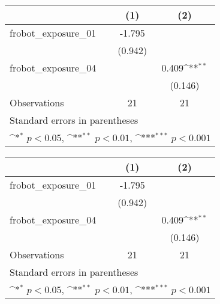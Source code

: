 {
\def\sym#1{\ifmmode^{#1}\else\(^{#1}\)\fi}
\begin{tabular}{l*{2}{c}}
\toprule
                    &\multicolumn{1}{c}{(1)}         &\multicolumn{1}{c}{(2)}         \\
\midrule
frobot\_exposure\_01  &      -1.795         &                     \\
                    &     (0.942)         &                     \\
\addlinespace
frobot\_exposure\_04  &                     &       0.409\sym{**} \\
                    &                     &     (0.146)         \\
\midrule
Observations        &          21         &          21         \\
\bottomrule
\multicolumn{3}{l}{\footnotesize Standard errors in parentheses}\\
\multicolumn{3}{l}{\footnotesize \sym{*} \(p<0.05\), \sym{**} \(p<0.01\), \sym{***} \(p<0.001\)}\\
\end{tabular}
}
{
\def\sym#1{\ifmmode^{#1}\else\(^{#1}\)\fi}
\begin{tabular}{l*{2}{c}}
\toprule
                    &\multicolumn{1}{c}{(1)}         &\multicolumn{1}{c}{(2)}         \\
\midrule
frobot\_exposure\_01  &      -1.795         &                     \\
                    &     (0.942)         &                     \\
\addlinespace
frobot\_exposure\_04  &                     &       0.409\sym{**} \\
                    &                     &     (0.146)         \\
\midrule
Observations        &          21         &          21         \\
\bottomrule
\multicolumn{3}{l}{\footnotesize Standard errors in parentheses}\\
\multicolumn{3}{l}{\footnotesize \sym{*} \(p<0.05\), \sym{**} \(p<0.01\), \sym{***} \(p<0.001\)}\\
\end{tabular}
}
